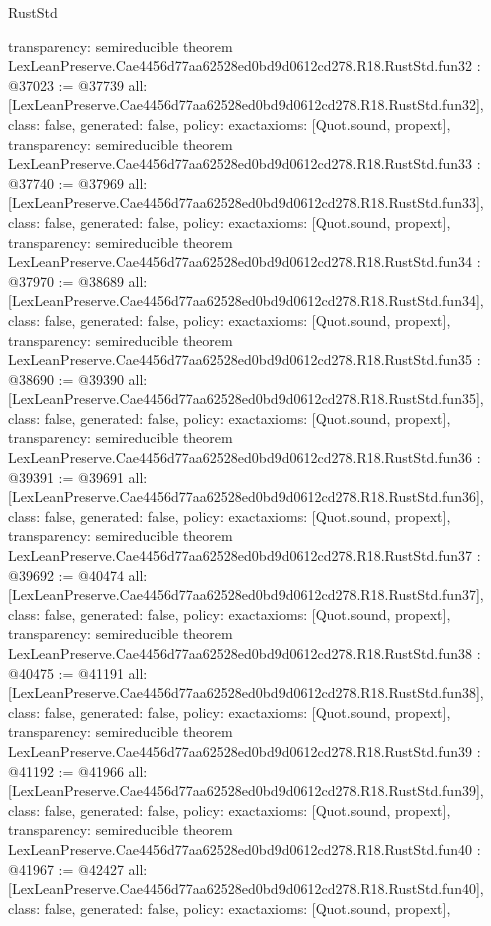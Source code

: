 \begin{lexlean}{RustStd}
\begin{coremodule}
{  transparency: semireducible
}
theorem LexLeanPreserve.Cae4456d77aa62528ed0bd9d0612cd278.R18.RustStd.fun32 : @37023 := @37739 {
  all: [LexLeanPreserve.Cae4456d77aa62528ed0bd9d0612cd278.R18.RustStd.fun32],
  class: false,
  generated: false,
  policy: exact{axioms: [Quot.sound, propext]},
  transparency: semireducible
}
theorem LexLeanPreserve.Cae4456d77aa62528ed0bd9d0612cd278.R18.RustStd.fun33 : @37740 := @37969 {
  all: [LexLeanPreserve.Cae4456d77aa62528ed0bd9d0612cd278.R18.RustStd.fun33],
  class: false,
  generated: false,
  policy: exact{axioms: [Quot.sound, propext]},
  transparency: semireducible
}
theorem LexLeanPreserve.Cae4456d77aa62528ed0bd9d0612cd278.R18.RustStd.fun34 : @37970 := @38689 {
  all: [LexLeanPreserve.Cae4456d77aa62528ed0bd9d0612cd278.R18.RustStd.fun34],
  class: false,
  generated: false,
  policy: exact{axioms: [Quot.sound, propext]},
  transparency: semireducible
}
theorem LexLeanPreserve.Cae4456d77aa62528ed0bd9d0612cd278.R18.RustStd.fun35 : @38690 := @39390 {
  all: [LexLeanPreserve.Cae4456d77aa62528ed0bd9d0612cd278.R18.RustStd.fun35],
  class: false,
  generated: false,
  policy: exact{axioms: [Quot.sound, propext]},
  transparency: semireducible
}
theorem LexLeanPreserve.Cae4456d77aa62528ed0bd9d0612cd278.R18.RustStd.fun36 : @39391 := @39691 {
  all: [LexLeanPreserve.Cae4456d77aa62528ed0bd9d0612cd278.R18.RustStd.fun36],
  class: false,
  generated: false,
  policy: exact{axioms: [Quot.sound, propext]},
  transparency: semireducible
}
theorem LexLeanPreserve.Cae4456d77aa62528ed0bd9d0612cd278.R18.RustStd.fun37 : @39692 := @40474 {
  all: [LexLeanPreserve.Cae4456d77aa62528ed0bd9d0612cd278.R18.RustStd.fun37],
  class: false,
  generated: false,
  policy: exact{axioms: [Quot.sound, propext]},
  transparency: semireducible
}
theorem LexLeanPreserve.Cae4456d77aa62528ed0bd9d0612cd278.R18.RustStd.fun38 : @40475 := @41191 {
  all: [LexLeanPreserve.Cae4456d77aa62528ed0bd9d0612cd278.R18.RustStd.fun38],
  class: false,
  generated: false,
  policy: exact{axioms: [Quot.sound, propext]},
  transparency: semireducible
}
theorem LexLeanPreserve.Cae4456d77aa62528ed0bd9d0612cd278.R18.RustStd.fun39 : @41192 := @41966 {
  all: [LexLeanPreserve.Cae4456d77aa62528ed0bd9d0612cd278.R18.RustStd.fun39],
  class: false,
  generated: false,
  policy: exact{axioms: [Quot.sound, propext]},
  transparency: semireducible
}
theorem LexLeanPreserve.Cae4456d77aa62528ed0bd9d0612cd278.R18.RustStd.fun40 : @41967 := @42427 {
  all: [LexLeanPreserve.Cae4456d77aa62528ed0bd9d0612cd278.R18.RustStd.fun40],
  class: false,
  generated: false,
  policy: exact{axioms: [Quot.sound, propext]},
}
\end{coremodule}
\end{lexlean}
